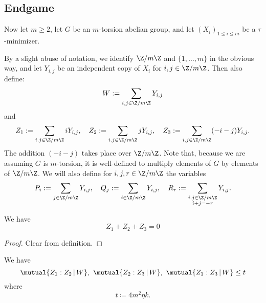 \subsection{Endgame}

Now let $m \geq 2$, let $G$ be an $m$-torsion abelian group, and let $(X_i)_{1 \leq i \leq m}$ be a $\tau$-minimizer.

\begin{definition}\label{more-random}  By a slight abuse of notation, we identify $\Z/m\Z$ and $\{1,\dots,m\}$ in the obvious way, and let $Y_{i,j}$ be an independent copy of $X_i$ for $i,j \in \Z/m\Z$.  Then also define:
  \[
    W := \sum_{i,j \in \Z/m\Z} Y_{i,j}
  \]
  and
  \[
    Z_1 := \sum_{i,j \in \Z/m\Z} i Y_{i,j},\ \ \
    Z_2 := \sum_{i,j \in \Z/m\Z} j Y_{i,j},\ \ \
    Z_3 := \sum_{i,j \in \Z/m\Z} (-i-j) Y_{i,j}.
  \]
  The addition $(-i-j)$ takes place over $\Z/m\Z$.
  Note that, because we are assuming $G$ is $m$-torsion, it is well-defined to multiply elements of $G$ by elements of $\Z/m\Z$.
  We will also define for $i,j,r \in \Z/m\Z$ the variables
  \begin{equation}\label{pqr-defs}
    P_i := \sum_{j \in \Z/m\Z} Y_{i,j} , \quad
    Q_j := \sum_{i \in \Z/m\Z} Y_{i,j} , \quad
    R_r := \sum_{\substack{i,j \in \Z/m\Z \\ i+j=-r}} Y_{i,j} .\end{equation}
\end{definition}

\begin{lemma}\label{Zero-sum} We have
  \begin{equation}%
    \label{eq:sum-zero}
    Z_1+Z_2+Z_3= 0
  \end{equation}
\end{lemma}

\begin{proof}  Clear from definition.
\end{proof}

\begin{proposition}\label{prop:52}
  We have
  \[
    \mutual{Z_1 : Z_2\, |\, W},\
    \mutual{Z_2 : Z_3\, |\, W},\
    \mutual{Z_1 : Z_3\, |\, W} \leq t
  \]
  where
  \begin{equation}\label{t-def}
    t \coloneqq 4m^2 \eta k.
  \end{equation}
\end{proposition}


